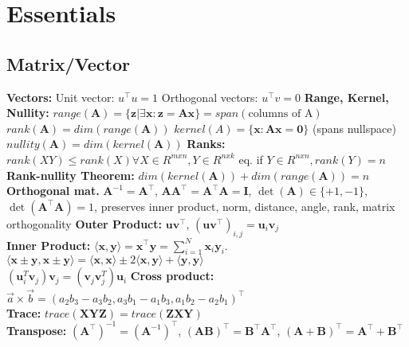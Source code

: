 \renewcommand{\baselinestretch}{0.1} 
\section{Essentials}
\subsection*{Matrix/Vector}
    \textbf{Vectors:}
    Unit vector: $u^{\top}u=1$
    Orthogonal vectors: $u^{\top}v=0$
    \textbf{Range, Kernel, Nullity:}
    $\mathit{range}(\mathbf{A}) = \{\textbf{z} | \exists \textbf{x}: \textbf{z}=\textbf{Ax}\} = \mathit{span}(\text{columns of A})$ \\
    $\mathit{rank}(\mathbf{A}) = \mathit{dim}(\mathit{range}(\mathbf{A}))$ 
    $\mathit{kernel}(A) = \{\mathbf{x}: \mathbf{Ax}=\mathbf{0}\}$ (spans nullspace)
    $\mathit{nullity}(\mathbf{A}) = \mathit{dim}(\mathit{kernel}(\mathbf{A}))$
    \textbf{Ranks:} $rank(XY) \leq rank(X) \forall X \in R^{mxn}, Y \in R^{nxk}$ eq. if  $Y \in R^{nxn}, rank(Y) = n$
    \textbf{Rank-nullity Theorem:}
    $\textit{dim}(\textit{kernel}(\textbf{A}))+\textit{dim}(\textit{range}(\textbf{A})) = n$\\
	\textbf{Orthogonal mat.} $\mathbf{A}^{-1} = \mathbf{A}^\top$, $\mathbf{A} \mathbf{A}^\top = \mathbf{A}^\top \mathbf{A} = \mathbf{I}$, $\operatorname{det}(\mathbf{A}) \in \{+1, -1\}$, $\operatorname{det}(\mathbf{A}^\top \mathbf{A}) = 1$,
	preserves inner product, norm, distance, angle, rank, matrix orthogonality \textbf{Outer Product:} $\mathbf{u} \mathbf{v}^\top$, $(\mathbf{u} \mathbf{v}^\top)_{i, j} = \mathbf{u}_i \mathbf{v}_j$\\
	\textbf{Inner Product:} $\langle \mathbf{x}, \mathbf{y} \rangle = \mathbf{x}^\top \mathbf{y} = \sum_{i=1}^{N} \mathbf{x}_i \mathbf{y}_i$.
	$\langle \mathbf{x} \pm \mathbf{y}, \mathbf{x} \pm \mathbf{y} \rangle = \langle \mathbf{x}, \mathbf{x} \rangle \pm 2 \langle \mathbf{x}, \mathbf{y} \rangle + \langle \mathbf{y}, \mathbf{y} \rangle$\\
	$(\mathbf{u}_i^T\mathbf{v}_j)\mathbf{v}_j = (\mathbf{v}_j\mathbf{v}_j^T)\mathbf{u}_i$ 
	\textbf{Cross product:} $\vec{a}\times\vec{b}=(a_2b_3-a_3b_2, a_3b_1-a_1b_3, a_1b_2-a_2b_1)^\top$\\
    \textbf{Trace:} $\mathit{trace}(\mathbf{XYZ})=\mathit{trace}(\mathbf{ZXY})$\\
	\textbf{Transpose:} $(\mathbf{A}^\top)^{-1} = (\mathbf{A}^{-1})^\top$,  $(\mathbf{A}\mathbf{B})^\top= \mathbf{B}^\top\mathbf{A}^\top$, $(\mathbf{A}+\mathbf{B})^\top= \mathbf{A}^\top + \mathbf{B}^\top$\\
